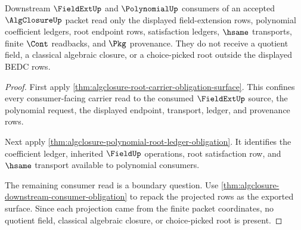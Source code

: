 \begin{theorem}
\label{thm:algclosure-fieldext-consumer-boundary}
Downstream $\FieldExtUp$ and $\PolynomialUp$ consumers of an accepted
$\AlgClosureUp$ packet read only the displayed field-extension rows,
polynomial coefficient ledgers, root endpoint rows, satisfaction ledgers,
$\hsame$ transports, finite $\Cont$ readbacks, and $\Pkg$ provenance. They do
not receive a quotient field, a classical algebraic closure, or a
choice-picked root outside the displayed BEDC rows.
\end{theorem}
\begin{proof}
First apply \autoref{thm:algclosure-root-carrier-obligation-surface}. This
confines every consumer-facing carrier read to the consumed $\FieldExtUp$
source, the polynomial request, the displayed endpoint, transport, ledger, and
provenance rows.

Next apply \autoref{thm:algclosure-polynomial-root-ledger-obligation}. It
identifies the coefficient ledger, inherited $\FieldUp$ operations, root
satisfaction row, and $\hsame$ transport available to polynomial consumers.

The remaining consumer read is a boundary question. Use
\autoref{thm:algclosure-downstream-consumer-obligation} to repack the
projected rows as the exported surface. Since each projection came from the
finite packet coordinates, no quotient field, classical algebraic closure, or
choice-picked root is present.
\end{proof}

